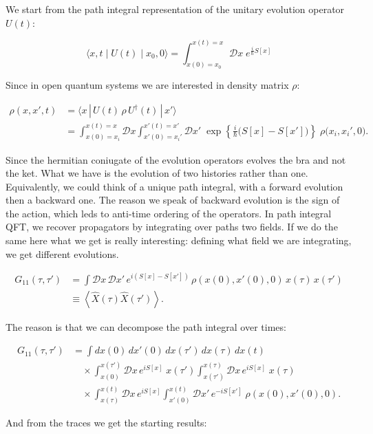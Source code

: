 \documentclass[12pt,a4paper,oneside]{article}
\numberwithin{equation}{section}   %
\begin{document}
We start from the path integral representation of the unitary evolution operator $U(t)$:

\[
\langle x,t\mid U(t)\mid x_0,0\rangle = \int_{x(0)=x_0}^{x(t)=x} \mathcal{D}x\; e^{\tfrac{i}{\hbar}S[x]}
\]

Since in open quantum systems we are interested in density matrix $\rho$:

\begin{align}
\rho(x,x',t) &= \langle x\,|\,U(t)\,\rho\,U^\dagger(t)\,|\,x'\rangle \\
&= \int_{x(0)=x_i}^{x(t)=x}\mathcal{D}x\int_{x'(0)=x_i'}^{x'(t)=x'}\mathcal{D}x'\;\exp\left\{\frac{i}{\hbar}\big(S[x]-S[x']\big)\right\}\;\rho\big(x_i,x_i',0\big).
\end{align}

Since the hermitian coniugate of the evolution operators evolves the bra and not the ket.
What we have is the evolution of two histories rather than one. 
Equivalently, we could think of a unique path integral, with a forward evolution then a 
backward one. The reason we speak of backward evolution is the sign
of the action, which leds to anti-time ordering of the operators. In path integral QFT,
we recover propagators by integrating over paths two fields. If we do the same 
here what we get is really interesting: defining what field we are integrating, we get
different evolutions.

\begin{align}
G_{11}(\tau,\tau')
&=
\int \mathcal{D}x\,\mathcal{D}x'\,
e^{i\left(S[x]-S[x']\right)}
\,\rho\!\left(x(0),x'(0),0\right)\,
x(\tau)\,x(\tau')
\nonumber\\
&\equiv
\left\langle
\hat X(\tau)\hat X(\tau')
\right\rangle .
\end{align}

The reason is that we can decompose the path integral over times:

\begin{align}
G_{11}(\tau,\tau')
&=
\int dx(0)\,dx'(0)\,dx(\tau')\,dx(\tau)\,dx(t)
\nonumber\\
&\quad\times
\int_{x(0)}^{x(\tau')}
\mathcal{D}x\,
e^{iS[x]}
\;
x(\tau')
\int_{x(\tau')}^{x(\tau)}
\mathcal{D}x\,
e^{iS[x]}
\;
x(\tau)
\nonumber\\
&\quad\times
\int_{x(\tau)}^{x(t)}
\mathcal{D}x\,
e^{iS[x]}
\int_{x'(0)}^{x(t)}
\mathcal{D}x'\,
e^{-iS[x']}
\;
\rho\!\left(x(0),x'(0),0\right).
\end{align}

And from the traces we get the starting results:
\end{document}
